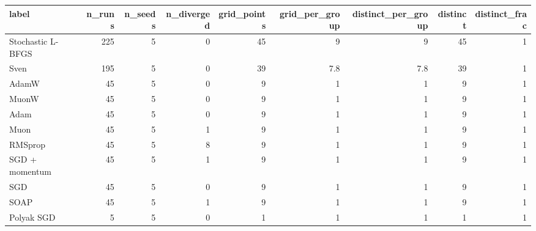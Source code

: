 \begin{tabular}{lrrrrrrrr}
\toprule
label & n\_runs & n\_seeds & n\_diverged & grid\_points & grid\_per\_group & distinct\_per\_group & distinct & distinct\_frac \\
\midrule
Stochastic L-BFGS & 225 & 5 & 0 & 45 & 9 & 9 & 45 & 1 \\
Sven & 195 & 5 & 0 & 39 & 7.8 & 7.8 & 39 & 1 \\
AdamW & 45 & 5 & 0 & 9 & 1 & 1 & 9 & 1 \\
MuonW & 45 & 5 & 0 & 9 & 1 & 1 & 9 & 1 \\
Adam & 45 & 5 & 0 & 9 & 1 & 1 & 9 & 1 \\
Muon & 45 & 5 & 1 & 9 & 1 & 1 & 9 & 1 \\
RMSprop & 45 & 5 & 8 & 9 & 1 & 1 & 9 & 1 \\
SGD + momentum & 45 & 5 & 1 & 9 & 1 & 1 & 9 & 1 \\
SGD & 45 & 5 & 0 & 9 & 1 & 1 & 9 & 1 \\
SOAP & 45 & 5 & 1 & 9 & 1 & 1 & 9 & 1 \\
Polyak SGD & 5 & 5 & 0 & 1 & 1 & 1 & 1 & 1 \\
\bottomrule
\end{tabular}
